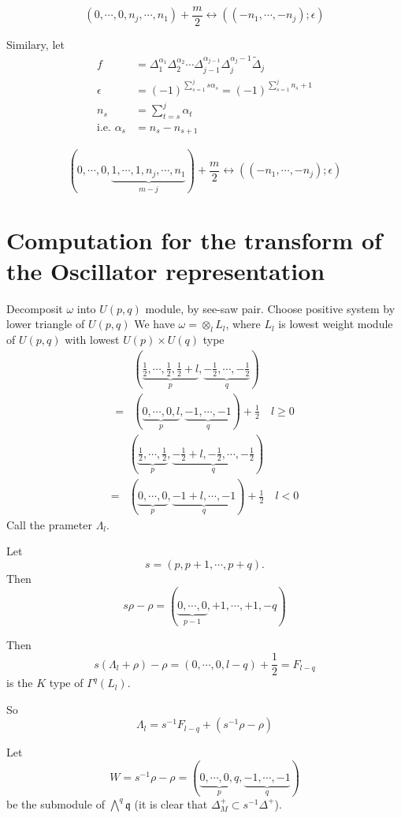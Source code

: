 \documentclass[12pt]{article}
\def\tDelta{\widetilde{\Delta}}
\def\fqq{\mathfrak{q}}
\begin{document}
\[
(0,\cdots, 0, n_j, \cdots, n_1)+\frac{m}{2}
\leftrightarrow
((-n_1, \cdots, -n_j); \epsilon)
\]

Similary, let
\begin{align*}
f &= \Delta_1^{\alpha_1}\Delta_2^{\alpha_2} \cdots \Delta_{j-1}^{\alpha_{j-1}}\Delta_j^{\alpha_j-1}\tDelta_j\\
\epsilon &= (-1)^{\sum_{s=1}^j s\alpha_s} = (-1)^{\sum_{s=1}^j n_s+1}\\
n_s &= \sum_{t=s}^j \alpha_t\\
\text{i.e. } \alpha_s &= n_s-n_{s+1}
\end{align*}

\[
(0,\cdots, 0,\underbrace{1, \cdots, 1, n_j, \cdots, n_1}_{m-j})+\frac{m}{2}
\leftrightarrow
((-n_1, \cdots, -n_j); \epsilon)
\]


\section{Computation for the transform of the Oscillator representation}
Decomposit $\omega$ into $U(p,q)$ module, by see-saw pair.
Choose positive system by lower triangle of $U(p,q)$
We have
$\omega = \otimes_{l} L_l$, 
where $L_l$ is lowest weight module of $U(p,q)$ with lowest $U(p)\times U(q)$ 
type
\[
\begin{split}
&(\underbrace{\frac{1}{2},\cdots, \frac{1}{2}, \frac{1}{2}+l}_p, 
\underbrace{-\frac{1}{2},\cdots, -\frac{1}{2}}_q)\\
=&
(\underbrace{0, \cdots, 0, l}_p, 
\underbrace{-1,\cdots, -1}_q)+\frac{1}{2}
\quad l \geq 0
\end{split}
\]
\[
\begin{split}
&(\underbrace{\frac{1}{2},\cdots, \frac{1}{2}}_p,  
\underbrace{-\frac{1}{2}+l,-\frac{1}{2},\cdots, -\frac{1}{2}}_q)\\
=&
(\underbrace{0, \cdots,  0}_p, 
\underbrace{-1+l,\cdots, -1}_q)+\frac{1}{2}
\quad l < 0
\end{split}
\]
Call the prameter $\Lambda_l$.

Let \[s = (p,p+1,\cdots, p+q).\]
Then 
\[
s\rho-\rho = (\underbrace{0,\cdots,0}_{p-1},+1,\cdots, +1, -q)
\]

Then 
\[
s(\Lambda_l+\rho)-\rho = (0, \cdots, 0, l-q) +\frac{1}{2}
=F_{l-q}
\]
is the $K$ type of $\Gamma^q(L_l)$. 

So 
\[
\Lambda_l =  s^{-1} F_{l-q} + (s^{-1}\rho -\rho)
\]

Let 
\[
W= s^{-1}\rho -\rho
= (\underbrace{0,\cdots, 0, q}_p, \underbrace{-1, \cdots, -1}_q)
\]
 be the submodule of $\bigwedge^q \fqq$ (it is clear that $\Delta^+_M\subset s^{-1}\Delta^+$). 
\end{document}
